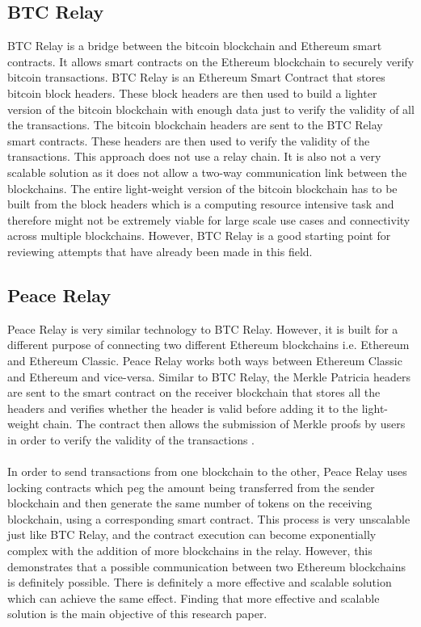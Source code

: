 \documentclass[a4paper,twoside,phd]{BYUPhys}
\begin{document}
\subsection{BTC Relay}
BTC Relay is a bridge between the bitcoin blockchain and Ethereum smart contracts. It allows smart contracts on the Ethereum blockchain to securely verify bitcoin transactions. BTC Relay is an Ethereum Smart Contract that stores bitcoin block headers. These block headers are then used to build a lighter version of the bitcoin blockchain with enough data just to verify the validity of all the transactions. The bitcoin blockchain headers are sent to the BTC Relay smart contracts. These headers are then used to verify the validity of the transactions. This approach does not use a relay chain. It is also not a very scalable solution as it does not allow a two-way communication link between the blockchains. The entire light-weight version of the bitcoin blockchain has to be built from the block headers which is a computing resource intensive task and therefore might not be extremely viable for large scale use cases and connectivity across multiple blockchains. However, BTC Relay is a good starting point for reviewing attempts that have already been made in this field. \cite{2018BTCRelay}\cite{2018FrequentlyDocumentation}
\subsection{Peace Relay}
Peace Relay is very similar technology to BTC Relay. However, it is built for a different purpose of connecting two different Ethereum blockchains i.e. Ethereum and Ethereum Classic. Peace Relay works both ways between Ethereum Classic and Ethereum and vice-versa. Similar to BTC Relay, the Merkle Patricia headers are sent to the smart contract on the receiver blockchain that stores all the headers and verifies whether the header is valid before adding it to the light-weight chain. The contract then allows the submission of Merkle proofs by users in order to verify the validity of the transactions \cite{LoiLuu2017PeaceRelay:Blockchains}.
\\
\\
In order to send transactions from one blockchain to the other, Peace Relay uses locking contracts which peg the amount being transferred from the sender blockchain and then generate the same number of tokens on the receiving blockchain, using a corresponding smart contract. This process is very unscalable just like BTC Relay, and the contract execution can become exponentially complex with the addition of more blockchains in the relay. However, this demonstrates that a possible communication between two Ethereum blockchains is definitely possible. There is definitely a more effective and scalable solution which can achieve the same effect. Finding that more effective and scalable solution is the main objective of this research paper.
\end{document}
